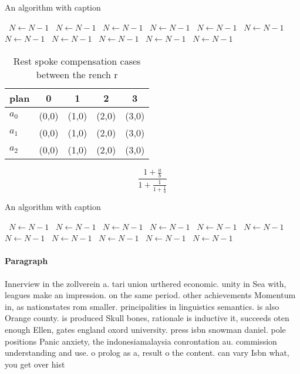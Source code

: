 \documentclass[a4paper]{article}
\begin{document}
\begin{algorithm}
\caption{An algorithm with caption}
\begin{algorithmic}
\    \State $N \gets N - 1$
\    \State $N \gets N - 1$
\    \State $N \gets N - 1$
\    \State $N \gets N - 1$
\    \State $N \gets N - 1$
\    \State $N \gets N - 1$
\    \State $N \gets N - 1$
\    \State $N \gets N - 1$
\    \State $N \gets N - 1$
\    \State $N \gets N - 1$
\    \State $N \gets N - 1$
\EndWhile
\end{algorithmic}
\end{algorithm}

\begin{table}
\begin{adjustbox}{width=0.6\columnwidth}
\begin{tabular}{|l|l|l|l|l|}
\hline
\textbf{plan} & \multicolumn{1}{c|}{\textbf{0}} & \multicolumn{1}{c|}{\textbf{1}} & \multicolumn{1}{c|}{\textbf{2}} & \multicolumn{1}{c|}{\textbf{3}} \\ \hline
\textbf{$a_0$}  & (0,0) & (1,0) & (2,0) & (3,0) \\ \hline
\textbf{$a_1$}  & (0,0) & (1,0) & (2,0) & (3,0) \\ \hline
\textbf{$a_2$}  & (0,0) & (1,0) & (2,0) & (3,0) \\ \hline
\end{tabular}
\end{adjustbox}
\caption{Rest spoke compensation cases between the rench r
}
\end{table}

\[ \frac{1+\frac{a}{b}}{1+\frac{1}{1+\frac{1}{a}}} \]

\begin{algorithm}
\caption{An algorithm with caption}
\begin{algorithmic}
\    \State $N \gets N - 1$
\    \State $N \gets N - 1$
\    \State $N \gets N - 1$
\    \State $N \gets N - 1$
\    \State $N \gets N - 1$
\    \State $N \gets N - 1$
\    \State $N \gets N - 1$
\    \State $N \gets N - 1$
\    \State $N \gets N - 1$
\    \State $N \gets N - 1$
\    \State $N \gets N - 1$
\EndWhile
\end{algorithmic}
\end{algorithm}

\paragraph{Paragraph}
Innerview in the zollverein a. tari union urthered economic. unity in Sea with, leagues make an impression. on the same period. other achievements Momentum in, as nationstates rom smaller. principalities in linguistics semantics. is also Orange county. is produced Skull bones, rationale is inductive it, succeeds oten enough Ellen, gates england oxord university. press isbn snowman daniel. pole positions Panic anxiety, the indonesiamalaysia conrontation au. commission understanding and use. o prolog as a, result o the content. can vary Isbn what, you get over hist
\end{document}
